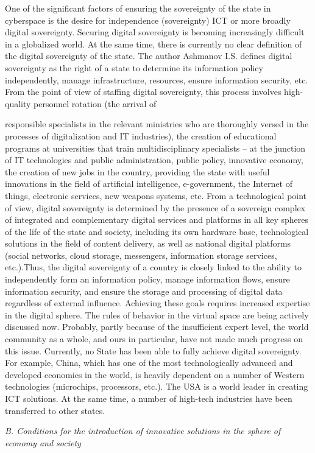 \documentclass{article}
\begin{document}
\begin{multicols}{2}
\begin{itemize}
\end{itemize}
One of the significant factors of ensuring the sovereignty
of the state in cyberspace is the desire for independence
(sovereignty) ICT or more broadly digital sovereignty.
Securing digital sovereignty is becoming increasingly
difficult in a globalized world. At the same time, there
is currently no clear definition of the digital sovereignty
of the state. The author Ashmanov I.S. defines digital
sovereignty as the right of a state to determine its
information policy independently, manage infrastructure,
resources, ensure information security, etc. From the
point of view of staffing digital sovereignty, this process
involves high-quality personnel rotation (the arrival of
\begin{flushleft}
responsible specialists in the relevant ministries who
are thoroughly versed in the processes of digitalization
and IT industries), the creation of educational programs
at universities that train multidisciplinary specialists –
at the junction of IT technologies and public administration, public policy, innovative economy, the creation
of new jobs in the country, providing the state with
useful innovations in the field of artificial intelligence,
e-government, the Internet of things, electronic services,
new weapons systems, etc. From a technological point of
view, digital sovereignty is determined by the presence
of a sovereign complex of integrated and complementary
digital services and platforms in all key spheres of the life
of the state and society, including its own hardware base,
technological solutions in the field of content delivery,
as well as national digital platforms (social networks,
cloud storage, messengers, information storage services,
etc.).Thus, the digital sovereignty of a country is closely
linked to the ability to independently form an information
policy, manage information flows, ensure information
security, and ensure the storage and processing of digital
data regardless of external influence. Achieving these
goals requires increased expertise in the digital sphere.
The rules of behavior in the virtual space are being
actively discussed now. Probably, partly because of the
insufficient expert level, the world community as a
whole, and ours in particular, have not made much
progress on this issue. Currently, no State has been able
to fully achieve digital sovereignty. For example, China,
which has one of the most technologically advanced and
developed economies in the world, is heavily dependent
on a number of Western technologies (microchips, processors, etc.). The USA is a world leader in creating
ICT solutions. At the same time, a number of high-tech
industries have been transferred to other states.
\end{flushleft}
\vspace{+4pt}
\begin{flushleft}
    \textit{B. Conditions for the introduction of innovative solutions
in the sphere of economy and society}
\end{flushleft}
\vspace{-1pt}


\end{multicols}
\end{document}
